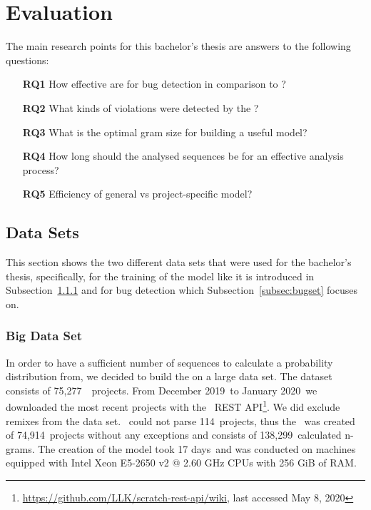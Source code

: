 
\newcommand{\numlarge}{75,277}
\newcommand{\monthstart}{December 2019}
\newcommand{\monthend}{January 2020}
\newcommand{\parsingexcp}{114}
\newcommand{\successfullyanalysed}{74,914}
\newcommand{\calculatedngrams}{138,299}
\newcommand{\creationtime}{17 days}

\chapter{Evaluation}\label{chap:evaluation}

The main research points for this bachelor's thesis are answers to the following questions:
\begin{itemize}
\item[\textbf{RQ1}] How effective are  for bug detection in comparison to \litterbox{}?
\item[\textbf{RQ2}] What kinds of violations were detected by the \ngram{}?
\item[\textbf{RQ3}] What is the optimal gram size for building a useful model?
\item[\textbf{RQ4}] How long should the analysed sequences be for an effective analysis process?
\item[\textbf{RQ5}] Efficiency of general \ngram{} vs project-specific model?
\end{itemize}


\section{Data Sets}\label{sec:dataset}
This section shows the two different data sets that were used for the bachelor's thesis, specifically, for the training of the model like it is introduced in Subsection~\ref{subsec:trainingset} and for bug detection which Subsection~\ref{subsec:bugset} focuses on.

\subsection{Big Data Set}\label{subsec:trainingset}
In order to have a sufficient number of sequences to calculate a probability distribution from, we decided to build the \ngram{} on a large data set. The dataset consists of \numlarge\ \scratch\ projects. From \monthstart\ to \monthend\ we downloaded the most recent projects with the \scratch\ REST API\footnote{\url{https://github.com/LLK/scratch-rest-api/wiki}, last accessed May 8, 2020}. We did exclude remixes from the data set. \litterbox\ could not parse \parsingexcp\ projects, thus the \ngram\ was created of \successfullyanalysed\ projects without any exceptions and consists of \calculatedngrams\ calculated n-grams. The creation of the model took \creationtime\ and was conducted on machines equipped with Intel Xeon E5-2650 v2 @ 2.60 GHz CPUs with 256 GiB of RAM.

